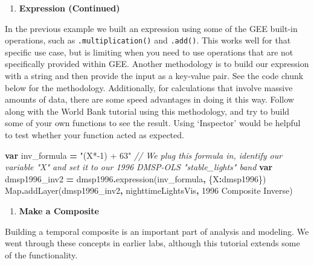 \documentclass[
]{article}
\newenvironment{Shaded}{\begin{snugshade}}{\end{snugshade}}
\newcommand{\BuiltInTok}[1]{#1}
\newcommand{\CommentTok}[1]{\textcolor[rgb]{0.56,0.35,0.01}{\textit{#1}}}
\newcommand{\FunctionTok}[1]{\textcolor[rgb]{0.00,0.00,0.00}{#1}}
\newcommand{\KeywordTok}[1]{\textcolor[rgb]{0.13,0.29,0.53}{\textbf{#1}}}
\newcommand{\NormalTok}[1]{#1}
\newcommand{\OperatorTok}[1]{\textcolor[rgb]{0.81,0.36,0.00}{\textbf{#1}}}
\newcommand{\StringTok}[1]{\textcolor[rgb]{0.31,0.60,0.02}{#1}}
\providecommand{\tightlist}{%
  \setlength{\itemsep}{0pt}\setlength{\parskip}{0pt}}
\begin{document}
\begin{enumerate}
\def\labelenumi{\arabic{enumi}.}
\setcounter{enumi}{5}
\tightlist
\item
  \textbf{Expression (Continued)}
\end{enumerate}

In the previous example we built an expression using some of the GEE built-in operations, such as \texttt{.multiplication()} and \texttt{.add()}. This works well for that specific use case, but is limiting when you need to use operations that are not specifically provided within GEE. Another methodology is to build our expression with a string and then provide the input as a key-value pair. See the code chunk below for the methodology. Additionally, for calculations that involve massive amounts of data, there are some speed advantages in doing it this way. Follow along with the World Bank tutorial using this methodology, and try to build some of your own functions to see the result. Using `Inspector' would be helpful to test whether your function acted as expected.

\begin{Shaded}
\begin{Highlighting}[]
\KeywordTok{var}\NormalTok{ inv\_formula }\OperatorTok{=} \StringTok{"(X*{-}1) + 63"}
\CommentTok{// We plug this formula in, identify our variable "X" and set it to our 1996 DMSP{-}OLS "stable\_lights" band}
\KeywordTok{var}\NormalTok{ dmsp1996\_inv2 }\OperatorTok{=}\NormalTok{ dmsp1996}\OperatorTok{.}\FunctionTok{expression}\NormalTok{(inv\_formula}\OperatorTok{,}\NormalTok{ \{}\StringTok{\textquotesingle{}X\textquotesingle{}}\OperatorTok{:}\NormalTok{dmsp1996\})}
\BuiltInTok{Map}\OperatorTok{.}\FunctionTok{addLayer}\NormalTok{(dmsp1996\_inv2}\OperatorTok{,}\NormalTok{ nighttimeLightsVis}\OperatorTok{,} \StringTok{\textquotesingle{}1996 Composite Inverse\textquotesingle{}}\NormalTok{)}
\end{Highlighting}
\end{Shaded}

\begin{enumerate}
\def\labelenumi{\arabic{enumi}.}
\setcounter{enumi}{6}
\tightlist
\item
  \textbf{Make a Composite}
\end{enumerate}

Building a temporal composite is an important part of analysis and modeling. We went through these concepts in earlier labs, although this tutorial extends some of the functionality.
\end{document}

